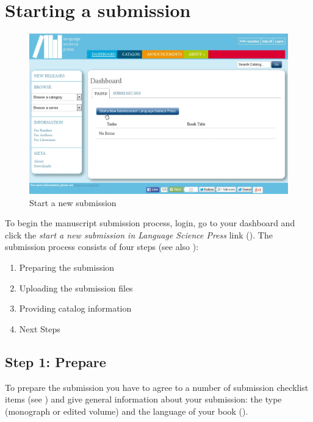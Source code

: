 \section{Starting a submission} \label{sec:submission}
\begin{figure}[h] \centering
\includegraphics[width=1\textwidth]{./img/startSubmission.jpg}
\caption{Start a new submission}
\label{fig:submission}
\end{figure}
To begin the manuscript submission process, login, go to your dashboard and click the \textit{start a new submission in Language Science Press} link (). The submission process consists of four steps (see also  ): 
\enlargethispage{\baselineskip}
\begin{enumerate}[noitemsep]
\item Preparing the submission
\item Uploading the submission files
\item Providing catalog information  
\item Next Steps
\end{enumerate}

\subsection*{Step 1: Prepare}

To prepare the submission you have to agree to a number of submission checklist items (see ) and give general information about your submission: the type (monograph or edited volume) and the language  of your book ().

